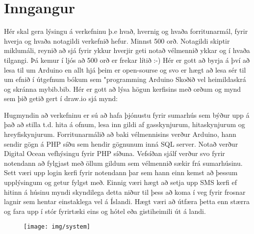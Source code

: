 \section{Inngangur}
Hér skal gera lýsingu á verkefninu þ.e hvað,  hvernig og  hvaða forritunarmál, fyrir hverja og hvaða notagildi verkefnið hefur. Minnst 500 orð. Notagildi skiptir miklumáli, reynið að sjá fyrir ykkur hverjir geti notað vélmennið ykkar og í hvaða tilgangi.  Þá kemur í ljós að 500 orð er frekar lítið :-) Hér er gott að byrja á því að lesa til um Arduino en allt hjá þeim er open-sourse og svo er hægt að lesa sér til um efnið í útgefnum bókum sem "programming Arduino \cite{monk} Skoðið vel heimildaskrá og skránna mybib.bib. Hér er gott að lýsa högun kerfisins með orðum og mynd sem þið getið gert í draw.io sjá mynd: 


Hugmyndin að verkefninu er sú að hafa þjónustu fyrir sumarhús sem býður upp á það að stilla t.d. hita á ofnum, lesa inn gildi af gasskynjurum, hitaskynjurum og hreyfiskynjurum. Forritunarmálið að baki vélmennisins verður Arduino, hann sendir gögn á PHP síðu sem hendir gögnunum inná SQL server. Notað verður Digital Ocean vefhýsingu fyrir PHP síðuna. Vefsíðan sjálf verður svo fyrir notendann að fylgjast með öllum gildum sem vélmennið sækir frá sumarhúsinu. Sett væri upp login kerfi fyrir notendann þar sem hann einn kemst að þessum upplýsingum og getur fylgst með. Einnig væri hægt að setja upp SMS kerfi ef hitinn á húsinu myndi skyndilega detta niður til þess að koma í veg fyrir frosnar lagnir sem hentar einstaklega vel á Íslandi. Hægt væri að útfæra þetta enn stærra og fara upp í stór fyrirtæki eins og hótel eða gistiheimili út á landi. 

\begin{figure}[h]
\texttt{[image: img/system]}
\end{figure}